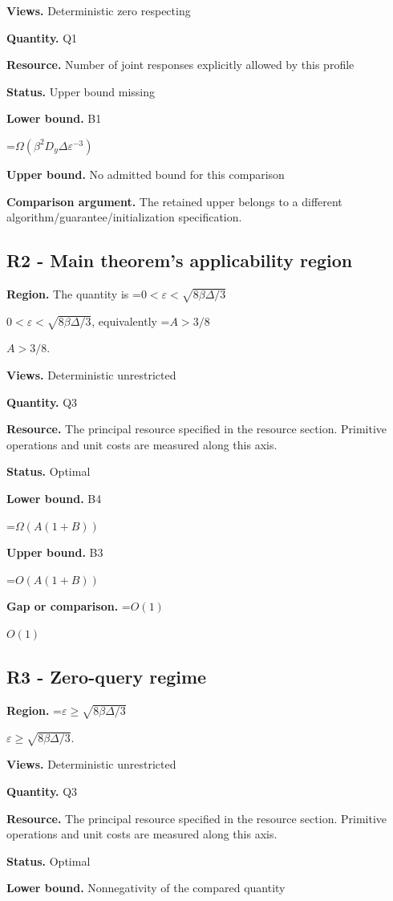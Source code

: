 \documentclass[10pt,a4paper]{article}
\newcommand{\AtlasMath}[1]{\par\begingroup\centering\setbox0=\hbox{$\displaystyle #1$}\ifdim\wd0>1.4\linewidth\typeout{ATLAS WIDE FORMULA: \the\wd0}\fi\ifdim\wd0>\linewidth\resizebox{\linewidth}{!}{\box0}\else\box0\fi\par\endgroup}
\newcommand{\AtlasInlineMath}[1]{\begingroup\setbox0=\hbox{$#1$}\ifdim\wd0>.4\linewidth\endgroup\AtlasMath{#1}\else\endgroup$#1$\fi}
\begin{document}
\textbf{Views.} Deterministic zero respecting

\textbf{Quantity.} Q1

\textbf{Resource.} Number of joint responses explicitly allowed by this profile

\textbf{Status.} Upper bound missing

\textbf{Lower bound.} B1

\AtlasMath{\Omega(\beta^2D_y\Delta\varepsilon^{-3})}
\textbf{Upper bound.} No admitted bound for this comparison

\textbf{Comparison argument.} The retained upper belongs to a different algorithm/guarantee/initialization specification.

\subsection{R2 - Main theorem's applicability region}
\textbf{Region.} The quantity is \AtlasInlineMath{0<\varepsilon<\sqrt{8\beta\Delta/3}}, equivalently \AtlasInlineMath{A>3/8}.

\textbf{Views.} Deterministic unrestricted

\textbf{Quantity.} Q3

\textbf{Resource.} The principal resource specified in the resource section. Primitive operations and unit costs are measured along this axis.

\textbf{Status.} Optimal

\textbf{Lower bound.} B4

\AtlasMath{\Omega(A(1+B))}
\textbf{Upper bound.} B3

\AtlasMath{O(A(1+B))}
\textbf{Gap or comparison.} \AtlasInlineMath{O(1)}

\subsection{R3 - Zero-query regime}
\textbf{Region.} \AtlasInlineMath{\varepsilon\ge\sqrt{8\beta\Delta/3}}.

\textbf{Views.} Deterministic unrestricted

\textbf{Quantity.} Q3

\textbf{Resource.} The principal resource specified in the resource section. Primitive operations and unit costs are measured along this axis.

\textbf{Status.} Optimal

\textbf{Lower bound.} Nonnegativity of the compared quantity
\end{document}
